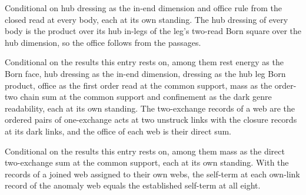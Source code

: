 \begin{chconditional}\label{box:VIII-1-mass-unit-and-the-first-power:10}
Conditional on hub dressing as the in-end dimension and office rule from the closed read at every body, each at its own standing. The hub dressing of every body is the product over its hub in-legs of the leg's two-read Born square over the hub dimension, so the office follows from the passages.
\end{chconditional}
\begin{chconditional}\label{box:VIII-1-mass-unit-and-the-first-power:11}
Conditional on the results this entry rests on, among them rest energy as the Born face, hub dressing as the in-end dimension, dressing as the hub leg Born product, office as the first order read at the common support, mass as the order-two chain sum at the common support and confinement as the dark genre readability, each at its own standing. The two-exchange records of a web are the ordered pairs of one-exchange acts at two unstruck links with the closure records at its dark links, and the office of each web is their direct sum.
\end{chconditional}
\begin{chconditional}\label{box:VIII-1-mass-unit-and-the-first-power:12}
Conditional on the results this entry rests on, among them mass as the direct two-exchange sum at the common support, each at its own standing. With the records of a joined web assigned to their own webs, the self-term at each own-link record of the anomaly web equals the established self-term at all eight.
\end{chconditional}
